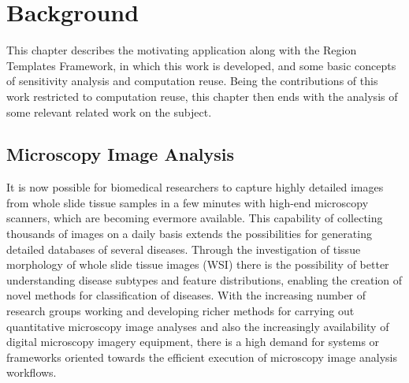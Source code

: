 \section{Background}

This chapter describes the motivating application along with the Region Templates Framework, in which this work is developed, and some basic concepts of sensitivity analysis and computation reuse. Being the contributions of this work restricted to computation reuse, this chapter then ends with the analysis of some relevant related work on the subject.

\subsection{Microscopy Image Analysis}

It is now possible for biomedical researchers to capture highly detailed images from whole slide tissue samples in a few minutes with high-end microscopy scanners, which are becoming evermore available. This capability of collecting thousands of images on a daily basis extends the possibilities for generating detailed databases of several diseases. Through the investigation of tissue morphology of whole slide tissue images (WSI) there is the possibility of better understanding disease subtypes and feature distributions, enabling the creation of novel methods for classification of diseases. With the increasing number of research groups working and developing richer methods for carrying out quantitative microscopy image analyses \cite{micro1, micro2, micro3, micro4, micro5, micro6, micro7, micro8} and also the increasingly availability of digital microscopy imagery equipment, there is a high demand for systems or frameworks oriented towards the efficient execution of microscopy image analysis workflows.


